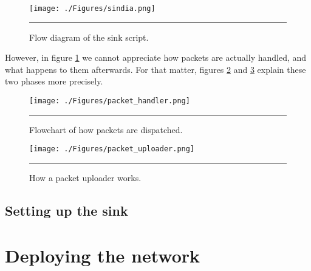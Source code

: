 \begin{figure}[htbp]
    \centering
        \texttt{[image: ./Figures/sindia.png]}
        \rule{35em}{0.5pt}
    \caption[Flow diagram of the sink script]{Flow diagram of the sink script.}
    \label{fig:sindia}
\end{figure}

However, in figure \ref{fig:sindia} we cannot appreciate how packets are actually handled, and what happens to them afterwards. For that matter, figures \ref{fig:phandler} and \ref{fig:puploader} explain these two phases more precisely.

\begin{figure}[htbp]
    \centering
        \texttt{[image: ./Figures/packet\_handler.png]}
        \rule{35em}{0.5pt}
    \caption[Packet dispatcher flowchart]{Flowchart of how packets are dispatched.}
    \label{fig:phandler}
\end{figure}

\begin{figure}[htbp]
    \centering
        \texttt{[image: ./Figures/packet\_uploader.png]}
        \rule{35em}{0.5pt}
    \caption[Packet uploader flowchart]{How a packet uploader works.}
    \label{fig:puploader}
\end{figure}

\subsection{Setting up the sink}



\section{Deploying the network}
